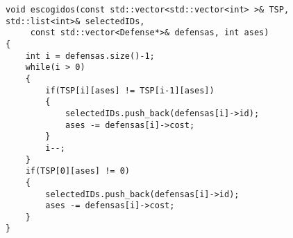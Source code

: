 \begin{lstlisting}
void escogidos(const std::vector<std::vector<int> >& TSP, std::list<int>& selectedIDs,
     const std::vector<Defense*>& defensas, int ases)
{
    int i = defensas.size()-1;
    while(i > 0)
    {
        if(TSP[i][ases] != TSP[i-1][ases])
        {
            selectedIDs.push_back(defensas[i]->id);
            ases -= defensas[i]->cost;
        }
        i--;
    } 
    if(TSP[0][ases] != 0)
    {
        selectedIDs.push_back(defensas[i]->id);
        ases -= defensas[i]->cost;
    }
}
\end{lstlisting}